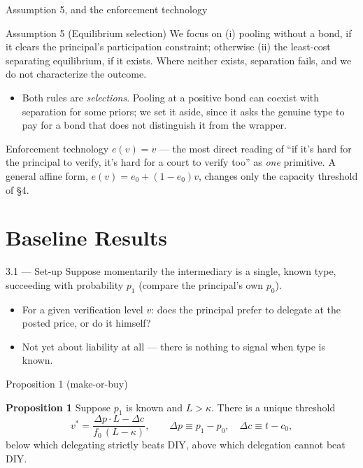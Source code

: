 \documentclass[11pt,aspectratio=169]{beamer}
\newcommand{\PropTitle}[1]{\textbf{Proposition #1}}
\begin{document}
\begin{frame}{Assumption 5, and the enforcement technology}
\begin{exampleblock}{Assumption 5 (Equilibrium selection)}
We focus on (i) pooling without a bond, if it clears the principal's participation constraint; otherwise (ii) the least-cost separating equilibrium, if it exists. Where neither exists, separation fails, and we do not characterize the outcome.
\end{exampleblock}
\begin{itemize}
  \item Both rules are \emph{selections}. Pooling at a positive bond can coexist with separation for some priors; we set it aside, since it asks the genuine type to pay for a bond that does not distinguish it from the wrapper.
\end{itemize}
\vfill
\begin{block}{Enforcement technology}
$e(v)=v$ --- the most direct reading of ``if it's hard for the principal to verify, it's hard for a court to verify too'' as \emph{one} primitive. A general affine form, $e(v)=e_0+(1-e_0)v$, changes only the capacity threshold of \S4.
\end{block}
\end{frame}

\section{Baseline Results}

\begin{frame}{3.1 --- Set-up}
Suppose momentarily the intermediary is a \alert{single, known} type, succeeding with probability $p_1$ (compare the principal's own $p_0$).
\vfill
\begin{itemize}
  \item For a given verification level $v$: does the principal prefer to delegate at the posted price, or do it himself?
  \item Not yet about liability at all --- there is nothing to signal when type is known.
\end{itemize}
\end{frame}

\begin{frame}{Proposition 1 (make-or-buy)}
\begin{exampleblock}{\PropTitle{1}}
Suppose $p_1$ is known and $L>\kappa$. There is a unique threshold
\begin{equation*}
  v^{*} = \frac{\Delta p\cdot L-\Delta c}{f_0\,(L-\kappa)},\qquad \Delta p\equiv p_1-p_0,\quad \Delta c\equiv t-c_0,
\end{equation*}
below which delegating strictly beats DIY, above which delegation cannot beat DIY.
\end{exampleblock}
\end{frame}
\end{document}
